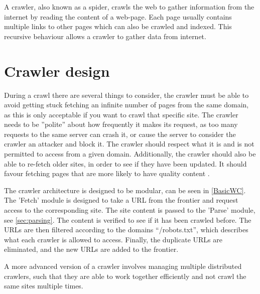 A crawler, also known as a spider, crawls the web to gather information from the
internet by reading the content of a web-page. Each page usually contains
multiple links to other pages which can also be crawled and indexed. This
recursive behaviour allows a crawler to gather data from internet.

\section{Crawler design}
During a crawl there are several things to consider, the crawler must be able
to avoid getting stuck fetching an infinite number of pages from the same
domain, as this is only acceptable if you want to crawl that specific site. The
crawler needs to be ''polite'' about how frequently it makes its request, as
too many requests to the same server can crash it, or cause the server to
consider the crawler an attacker and block it. The crawler should respect what
it is and is not permitted to access from a given domain. Additionally, the
crawler should also be able to re-fetch older sites, in order to see if they
have been updated. It should favour fetching pages that are more likely to have
quality content \citep[Ch. 20.1]{manning2008introduction}.\nl

The crawler architecture is designed to be modular, can be seen in
\autoref{BasicWC}. The 'Fetch' module is designed to take a URL from the
frontier and request access to the corresponding site. The site content is
passed to the 'Parse' module, see \autoref{sec:parsing}.
The content is verified to see if it has been crawled before. The URLs are then
filtered according to the domains ``/robots.txt'', which describes what each
crawler is allowed to access. Finally, the duplicate URLs are eliminated, and
the new URLs are added to the frontier.


A more advanced version of a crawler involves managing multiple distributed
crawlers, such that they are able to work together efficiently and not crawl
the same sites multiple times.

